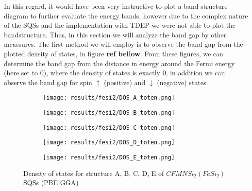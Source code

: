 In this regard, it would have been very instructive to plot a band structure diagram to further evaluate the energy bands, however due to the complex nature of the SQSs and the implementation with TDEP we were not able to plot the bandstructure. Thus, in this section we will analyze the band gap by other meassures. The first method we will employ is to observe the band gap from the plotted density of states, in figure \textbf{ref bellow}. From these figures, we can determine the band gap from the distance in energy around the Fermi energy (here set to 0), where the density of states is exactly 0, in addition we can observe the band gap for spin $\uparrow$ (positive) and $\downarrow$ (negative) states.   

\begin{figure}[H]
	\centering
	\begin{subfigure}{0.9\textwidth}
		\texttt{[image: results/fesi2/DOS\_A\_toten.png]}
	\end{subfigure}

	\begin{subfigure}{0.9\textwidth}
		\texttt{[image: results/fesi2/DOS\_B\_toten.png]}
	\end{subfigure}
	\begin{subfigure}{0.9\textwidth}
		\texttt{[image: results/fesi2/DOS\_C\_toten.png]}
	\end{subfigure}
\end{figure}
\begin{figure}[H]
	\centering
	\begin{subfigure}{0.9\textwidth}
		\texttt{[image: results/fesi2/DOS\_D\_toten.png]}
	\end{subfigure}
	\begin{subfigure}{0.9\textwidth}
		\texttt{[image: results/fesi2/DOS\_E\_toten.png]}
	\end{subfigure}
	\caption{Density of states for structure A, B, C, D, E of $CFMNSi_2 (FeSi_2)$ SQSs (PBE GGA)}
	\label{dos_fesi2_gga}
\end{figure}



